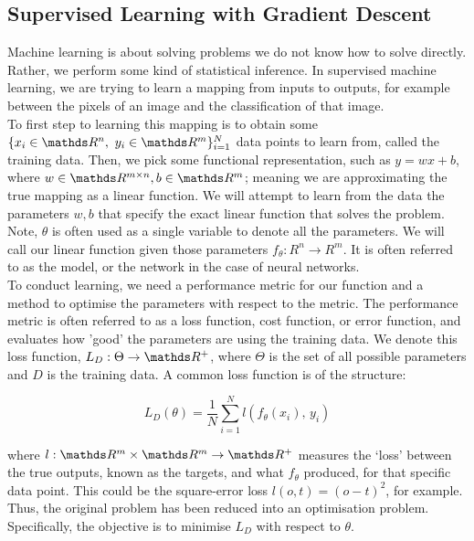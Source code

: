 \subsection{Supervised Learning with Gradient Descent}
Machine learning is about solving problems we do not know how to solve directly. Rather, we perform some kind of statistical inference. In supervised machine learning, we are trying to learn a mapping from inputs to outputs, for example between the pixels of an image and the classification of that image. \\

To first step to learning this mapping is to obtain some \(\{x_i \in \R^n, \ y_i \in \R^m\}_{i=1}^N\) data points to learn from, called the training data. Then, we pick some functional representation, such as \(y = wx + b\), where \(w \in \R^{m \times n}, b \in \R^m\); meaning we are approximating the true mapping as a linear function. We will attempt to learn from the data the parameters \(w, b\) that specify the exact linear function that solves the problem. Note, \(\theta\) is often used as a single variable to denote all the parameters. We will call our linear function given those parameters \(f_\theta : R^n \rightarrow R^m\). It is often referred to as the model, or the network in the case of neural networks. \\

To conduct learning, we need a performance metric for our function and a method to optimise the parameters with respect to the metric. The performance metric is often referred to as a loss function, cost function, or error function, and evaluates how 'good' the parameters are using the training data. We denote this loss function, \(L_D : \Theta \rightarrow \R^+\), where \(\Theta\) is the set of all possible parameters and \(D\) is the training data. A common loss function is of the structure:

\begin{equation*}
    L_D(\theta) = \frac{1}{N}\sum_{i=1}^N l(f_\theta(x_i),\, y_i)
\end{equation*}

where \(l : \R^m\times\R^m \rightarrow \R^+\) measures the `loss' between the true outputs, known as the targets, and what \(f_{\theta}\) produced, for that specific data point. This could be the square-error loss \(l(o, t) = (o-t)^2\), for example. \\

Thus, the original problem has been reduced into an optimisation problem. Specifically, the objective is to minimise \(L_D\) with respect to \(\theta\). \\

